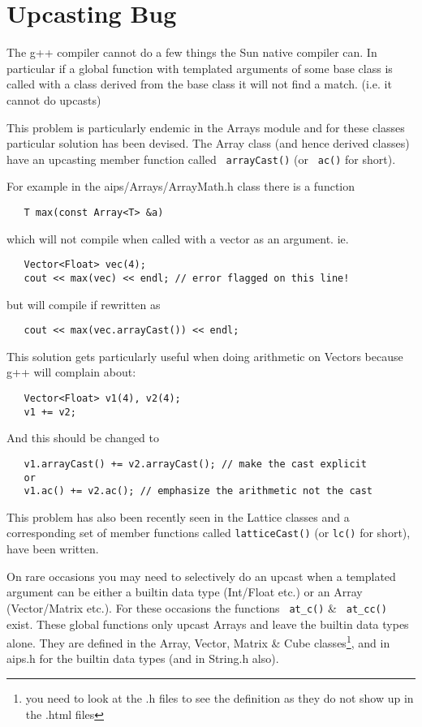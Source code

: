 \section{Upcasting Bug\label{sec:upcast}}
The g++ compiler cannot do a few things the Sun
native compiler can. In particular if a global function with templated
arguments of some base class is called with a class derived from the
base class it will not find a match. (i.e. it cannot do upcasts)

This problem is particularly endemic in the Arrays module and for these
classes particular solution has been devised. The Array class (and hence
derived classes) have an upcasting member function called \texttt{
  arrayCast()} (or \texttt{ ac()} for short).

For example in the aips/Arrays/ArrayMath.h class there is a function
\begin{verbatim}
   T max(const Array<T> &a) 
\end{verbatim}
which will not compile when called with a vector as an argument. ie.
\begin{verbatim}
   Vector<Float> vec(4);
   cout << max(vec) << endl; // error flagged on this line!
\end{verbatim}
but will compile if rewritten as
\begin{verbatim}
   cout << max(vec.arrayCast()) << endl; 
\end{verbatim}

This solution gets particularly useful when doing arithmetic on
Vectors because g++ will complain about:
\begin{verbatim}
   Vector<Float> v1(4), v2(4);
   v1 += v2;
\end{verbatim}
And this should be changed to
\begin{verbatim}
   v1.arrayCast() += v2.arrayCast(); // make the cast explicit
   or 
   v1.ac() += v2.ac(); // emphasize the arithmetic not the cast
\end{verbatim}

This problem has also been recently seen in the Lattice classes and a
corresponding set of member functions called \texttt{latticeCast()} (or
\texttt{lc()} for short), have been written. 

On rare occasions you may need to selectively do an upcast when a templated
argument can be either a builtin data type (Int/Float etc.) or an Array
(Vector/Matrix etc.). For these occasions the functions \texttt{ at\_c()} \&
\texttt{ at\_cc()} exist. These global functions only upcast Arrays and
leave the builtin data types alone. They are defined in the
Array, Vector, Matrix \& Cube classes\footnote{you need to look at the .h
  files to see the definition as they do not show up in the .html files},
and in aips.h for the builtin data types (and in String.h also). 

